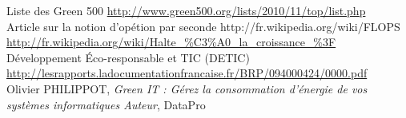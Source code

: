 \documentclass[a4paper,11pt,french]{report}
\begin{document}
\begin{thebibliography}{GreenIT}
 Liste des Green 500 \url{http://www.green500.org/lists/2010/11/top/list.php}\\

 Article sur la notion d'opétion par seconde \textsf{http://fr.wikipedia.org/wiki/FLOPS}\\

 \url{http://fr.wikipedia.org/wiki/Halte_\%C3\%A0_la_croissance_\%3F}\\

 Développement \'Eco-responsable et TIC (DETIC)
\url{http://lesrapports.ladocumentationfrancaise.fr/BRP/094000424/0000.pdf}\\

 Olivier PHILIPPOT, \emph{Green IT : Gérez la consommation d'énergie de vos systèmes informatiques Auteur}, DataPro\\

\end{thebibliography}
\end{document}
